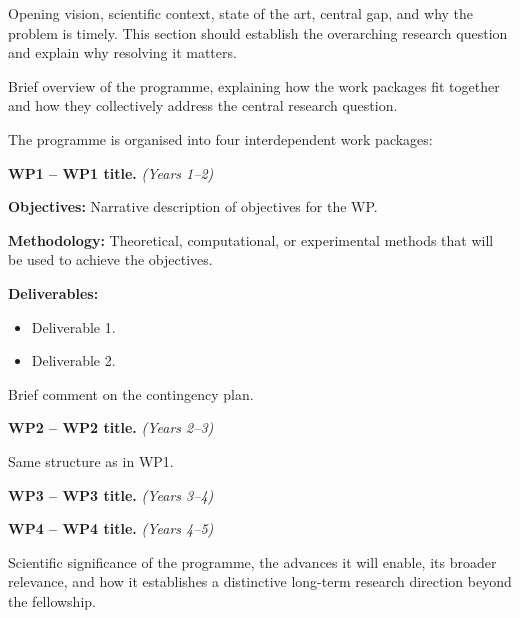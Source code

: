 \documentclass[
    11pt,
    twocolumn
]{article}
\begin{document}


Opening vision, scientific context, state of the art, central gap, and why the problem is timely. 
This section should establish the overarching research question and explain why resolving it matters. \cite{}

\medskip


Brief overview of the programme, explaining how the work packages fit together and how they collectively address the central research question.

The programme is organised into four interdependent work packages:

\medskip

\textbf{WP1 -- WP1 title.} \textit{(Years 1--2)}

\textbf{Objectives:}
Narrative description of objectives for the WP.

\textbf{Methodology:}
Theoretical, computational, or experimental methods that will be used to achieve the objectives.

\textbf{Deliverables:}

\begin{itemize}[
    leftmargin=2.75ex,
    itemsep=0pt,
    topsep=0pt,
    after=\vspace{-1ex}
]
    \item Deliverable 1.

    \item Deliverable 2.
\end{itemize}

Brief comment on the contingency plan.

\bigskip

\textbf{WP2 -- WP2 title.} \textit{(Years 2--3)}

Same structure as in WP1.

\bigskip

\textbf{WP3 -- WP3 title.} \textit{(Years 3--4)}

\bigskip

\textbf{WP4 -- WP4 title.} \textit{(Years 4--5)}

\medskip


Scientific significance of the programme, the advances it will enable, its broader relevance, and how it establishes a distinctive long-term research direction beyond the fellowship.

{
    \small
    
    
}
\end{document}
